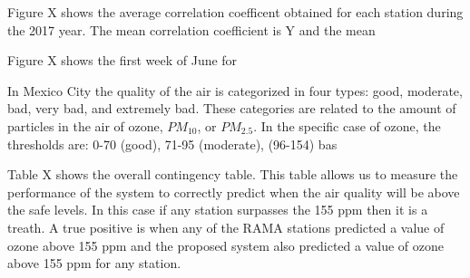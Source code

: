Figure X shows the average correlation coefficent obtained for each station during the 2017 year. The 
mean correlation coefficient is Y and the mean 


Figure X shows the first week of June for 

In Mexico City the quality of the air is categorized in four types: good, moderate, bad, very bad, and
extremely bad. These categories are related to the amount of particles in the air of ozone, $PM_{10}$, or
$PM_{2.5}$. In the specific case of ozone, the thresholds are: 0-70 (good), 71-95 (moderate), 
(96-154) bas

Table X shows the overall contingency table. This table allows us to measure the performance
of the system to correctly predict when the air quality will be above the safe levels. In this case
if any station surpasses the 155 ppm then it is a treath. A true positive is when any of the 
RAMA stations predicted a value of ozone above 155 ppm and the proposed system also
predicted a value of ozone above 155 ppm for any station. 




